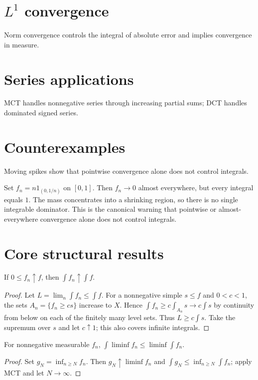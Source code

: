 \section{$L^1$ convergence}
Norm convergence controls the integral of absolute error and implies convergence in measure.

\section{Series applications}
MCT handles nonnegative series through increasing partial sums; DCT handles dominated signed series.

\section{Counterexamples}
Moving spikes show that pointwise convergence alone does not control integrals.


\begin{example}\label{ex:iii04-expand-03}
Set \(f_n=n1_{(0,1/n)}\) on \([0,1]\). Then \(f_n\to0\) almost everywhere,
but every integral equals \(1\). The mass concentrates into a shrinking region,
so there is no single integrable dominator. This is the canonical warning that
pointwise or almost-everywhere convergence alone does not control integrals.
\end{example}
\section{Core structural results}

\begin{theorem}\label{thm:iii04-01}
If $0\le f_n\uparrow f$, then $\int f_n\uparrow\int f$.
\begin{proof}
Let $L=\lim_n\int f_n\le\int f$. For a nonnegative simple $s\le f$ and $0<c<1$, the sets $A_n=\{f_n\ge cs\}$ increase to $X$. Hence $\int f_n\ge c\int_{A_n}s\to c\int s$ by continuity from below on each of the finitely many level sets. Thus $L\ge c\int s$. Take the supremum over $s$ and let $c\uparrow1$; this also covers infinite integrals.
\end{proof}
\end{theorem}

\begin{theorem}\label{thm:iii04-02}
For nonnegative measurable $f_n$, $\int\liminf f_n\le\liminf\int f_n$.
\begin{proof}
Set $g_N=\inf_{n\ge N}f_n$. Then $g_N\uparrow\liminf f_n$ and $\int g_N\le\inf_{n\ge N}\int f_n$; apply MCT and let $N\to\infty$.
\end{proof}
\end{theorem}

